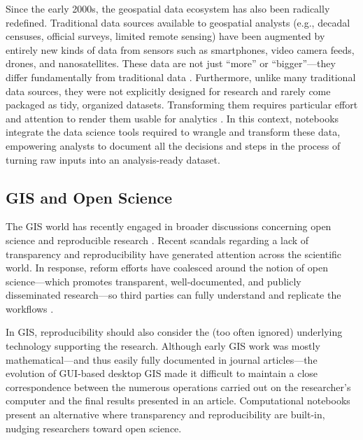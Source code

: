 \documentclass[11pt,letterpaper]{article}
\begin{document}
Since the early 2000s, the geospatial data ecosystem has also been radically redefined. Traditional data sources available to geospatial analysts (e.g., decadal censuses, official surveys, limited remote sensing) have been augmented by entirely new kinds of data from sensors such as smartphones, video camera feeds, drones, and nanosatellites. These data are not just \enquote{more} or \enquote{bigger}---they differ fundamentally from traditional data \citep{kitchin_what_2016}. Furthermore, unlike many traditional data sources, they were not explicitly designed for research and rarely come packaged as tidy, organized datasets. Transforming them requires particular effort and attention to render them usable for analytics \citep{harris_more_2017,singleton_geographic_2019}. In this context, notebooks integrate the data science tools required to wrangle and transform these data, empowering analysts to document all the decisions and steps in the process of turning raw inputs into an analysis-ready dataset.

\subsection{GIS and Open Science}

The GIS world has recently engaged in broader discussions concerning open science and reproducible research \citep{brunsdon_quantitative_2016,kedron_reproducibility_2019,kedron_reproducibility_2020}. Recent scandals regarding a lack of transparency and reproducibility have generated attention across the scientific world. In response, reform efforts have coalesced around the notion of open science---which promotes transparent, well-documented, and publicly disseminated research---so third parties can fully understand and replicate the workflows \citep{boeing_right_2020,koster_fueling_2020,wilson_five-star_2020,poorthuis_being_2019,rey_show_2009}.

In GIS, reproducibility should also consider the (too often ignored) underlying technology supporting the research. Although early GIS work was mostly mathematical---and thus easily fully documented in journal articles---the evolution of GUI-based desktop GIS made it difficult to maintain a close correspondence between the numerous operations carried out on the researcher's computer and the final results presented in an article. Computational notebooks present an alternative where transparency and reproducibility are built-in, nudging researchers toward open science.
\end{document}
